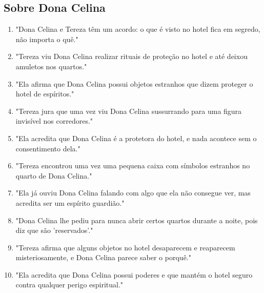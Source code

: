 \subsection*{Sobre Dona Celina}
\begin{enumerate}
    \item "Dona Celina e Tereza têm um acordo: o que é visto no hotel fica em segredo, não importa o quê."
    \item "Tereza viu Dona Celina realizar rituais de proteção no hotel e até deixou amuletos nos quartos."
    \item "Ela afirma que Dona Celina possui objetos estranhos que dizem proteger o hotel de espíritos."
    \item "Tereza jura que uma vez viu Dona Celina sussurrando para uma figura invisível nos corredores."
    \item "Ela acredita que Dona Celina é a protetora do hotel, e nada acontece sem o consentimento dela."
    \item "Tereza encontrou uma vez uma pequena caixa com símbolos estranhos no quarto de Dona Celina."
    \item "Ela já ouviu Dona Celina falando com algo que ela não consegue ver, mas acredita ser um espírito guardião."
    \item "Dona Celina lhe pediu para nunca abrir certos quartos durante a noite, pois diz que são 'reservados'."
    \item "Tereza afirma que alguns objetos no hotel desaparecem e reaparecem misteriosamente, e Dona Celina parece saber o porquê."
    \item "Ela acredita que Dona Celina possui poderes e que mantém o hotel seguro contra qualquer perigo espiritual."
\end{enumerate}

